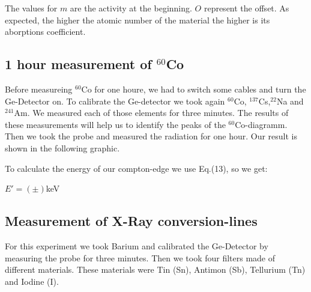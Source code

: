 The values for $m$ are the activity at the beginning. $O$ represent the offset. As expected, the higher the atomic number of the material the higher is its aborptions coefficient.

\newpage
\subsection{1 hour measurement of $^{60}$Co}
Before measureing $^{60}$Co for one houre, we had to switch some cables and turn the Ge-Detector on. To calibrate the Ge-detector we took again $^{60}$Co, $^{137}$Cs,$^{22}$Na and $^{241}$Am. We measured each of those elements for three minutes. The results of these measurements will help us to identify the peaks of the $^{60}$Co-diagramm. Then we took the probe and measured the radiation for one hour. Our result is shown in the following graphic.


To calculate the energy of our compton-edge we use Eq.(13), so we get:
\begin{center}
$E'=( \pm )$keV
\end{center}

\subsection{Measurement of X-Ray conversion-lines}
For this experiment we took Barium and calibrated the Ge-Detector by measuring the probe for three minutes. Then we took four filters made of different materials. These materials were Tin (Sn), Antimon (Sb),  Tellurium (Tn) and Iodine (I).

